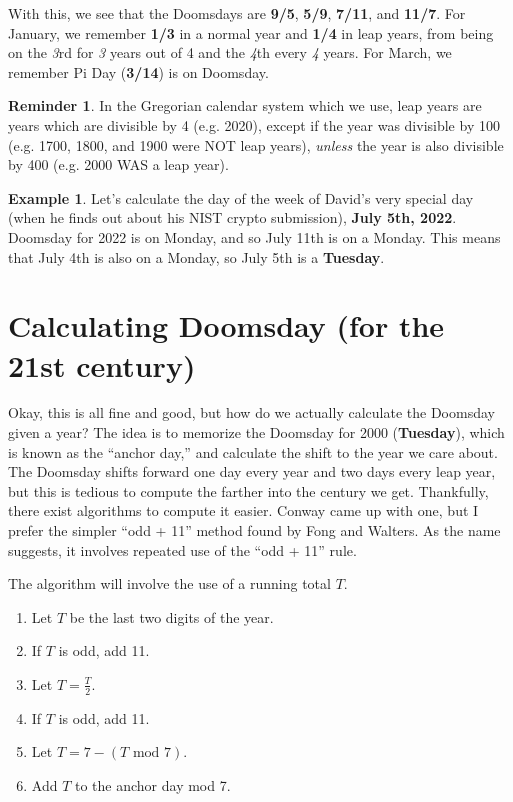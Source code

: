 \documentclass[12pt,letterpaper]{article}
\theoremstyle{plain}
\theoremstyle{definition}
\newtheorem{example}{Example}
\newtheorem*{reminder}{Reminder}
\begin{document}
With this, we see that the Doomsdays are \textbf{9/5}, \textbf{5/9}, \textbf{7/11}, and \textbf{11/7}. For January, we remember \textbf{1/3} in a normal year and \textbf{1/4} in leap years, from being on the \textit 3rd for \textit{3} years out of 4 and the \textit 4th every \textit 4 years. For March, we remember Pi Day (\textbf{3/14}) is on Doomsday. 

\begin{reminder}\label{rem:leapyear}
	In the Gregorian calendar system which we use, leap years are years which are divisible by 4 (e.g. 2020), except if the year was divisible by 100 (e.g. 1700, 1800, and 1900 were NOT leap years), \textit{unless} the year is also divisible by 400 (e.g. 2000 WAS a leap year). 
\end{reminder}

\begin{example}
	Let's calculate the day of the week of David's very special day (when he finds out about his NIST crypto submission), \textbf{July 5th, 2022}. Doomsday for 2022 is on Monday, and so July 11th is on a Monday. This means that July 4th is also on a Monday, so July 5th is a \textbf{Tuesday}.
\end{example} 

\section{Calculating Doomsday (for the 21st century)}

Okay, this is all fine and good, but how do we actually calculate the Doomsday given a year? The idea is to memorize the Doomsday for 2000 (\textbf{Tuesday}), which is known as the ``anchor day,'' and calculate the shift to the year we care about. The Doomsday shifts forward one day every year and two days every leap year, but this is tedious to compute the farther into the century we get. Thankfully, there exist algorithms to compute it easier. Conway came up with one, but I prefer the simpler ``odd + 11'' method found by Fong and Walters. As the name suggests, it involves repeated use of the ``odd + 11'' rule. 

The algorithm will involve the use of a running total \(T\). 
\begin{enumerate}
	\item Let \(T\) be the last two digits of the year. 
	\item If \(T\) is odd, add 11. 
	\item Let \(T=\frac{T}{2}\). 
	\item If \(T\) is odd, add 11. 
	\item Let \(T=7-(T\text{ mod } 7)\). 
	\item Add \(T\) to the anchor day mod 7. 
\end{enumerate}
\end{document}
